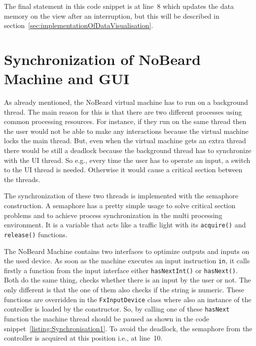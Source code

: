 The final statement in this code snippet is at line~8 which updates the data memory on the view after an interruption, but this will be described in section~\ref{sec:implementationOfDataVisualisation}.

\section{Synchronization of NoBeard Machine and GUI}
\label{sec:synchronization} 
As already mentioned, the NoBeard virtual machine has to run on a background thread. The main reason for this is that there are two different processes using common processing resources. For instance, if they run on the same thread then the user would not be able to make any interactions because the virtual machine locks the main thread. But, even when the virtual machine gets an extra thread there would be still a deadlock because the background thread has to synchronize with the UI thread. So e.g., every time the user has to operate an input, a switch to the UI thread is needed. Otherwise it would cause a critical section between the threads. 

The synchronization of these two threads is implemented with the semaphore construction. A semaphore has a pretty simple usage to solve critical section problems and to achieve process synchronization in the multi processing environment. It is a variable that acts like a traffic light with its \texttt{acquire()} and \texttt{release()} functions.

The NoBeard Machine contains two interfaces to optimize outputs and inputs on the used device. As soon as the machine executes an input instruction \lstinline$in$, it calls firstly a function from the input interface either \texttt{hasNextInt()} or \texttt{hasNext()}. Both do the same thing, checks whether there is an input by the user or not. The only different is that the one of them also checks if the string is numeric. These functions are overridden in the \texttt{FxInputDevice} class where also an instance of the controller is loaded by the constructor. So, by calling one of these \texttt{hasNext} function the machine thread should be paused as shown in the code snippet~\ref{listing:Synchronisation1}. To avoid the deadlock, the semaphore from the controller is acquired at this position i.e., at line~10.

